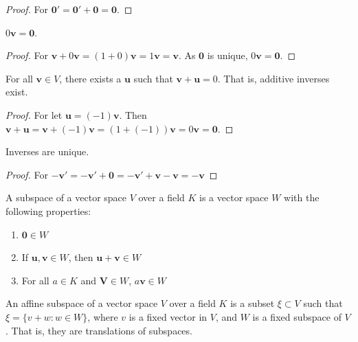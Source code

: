 \documentclass[crop=false,class=book,oneside]{standalone}
\begin{document}
            \begin{proof}
            For $\mathbf{0}'=\mathbf{0}'+\mathbf{0}=\mathbf{0}$.
            \end{proof}
            \begin{theorem}
            $0\mathbf{v} = \mathbf{0}$.
            \end{theorem}
            \begin{proof}
            For $\mathbf{v}+0\mathbf{v} = (1+0)\mathbf{v} = 1\mathbf{v} = \mathbf{v}$. As $\mathbf{0}$ is unique, $0\mathbf{v}=\mathbf{0}$.
            \end{proof}
            \begin{theorem}
            For all $\mathbf{v}\in V$, there exists a $\mathbf{u}$ such that $\mathbf{v}+\mathbf{u}=0$. That is, additive inverses exist.
            \end{theorem}
            \begin{proof}
            For let $\mathbf{u} = (-1)\mathbf{v}$. Then $\mathbf{v}+\mathbf{u} = \mathbf{v}+(-1)\mathbf{v} = (1+(-1))\mathbf{v} = 0\mathbf{v} = \mathbf{0}$.
            \end{proof}
            \begin{theorem}
            Inverses are unique.
            \end{theorem}
            \begin{proof}
            For $-\mathbf{v}'=-\mathbf{v}'+\mathbf{0}=-\mathbf{v}'+\mathbf{v}-\mathbf{v}=- \mathbf{v}$
            \end{proof}
            \begin{definition}
            A subspace of a vector space $V$ over a field $K$ is a vector space $W$ with the following properties:
            \begin{enumerate}
                \item $\mathbf{0} \in W$
                \item If $\mathbf{u,v}\in W$, then $\mathbf{u}+\mathbf{v} \in W$
                \item For all $a\in K$ and $\mathbf{V} \in W$, $a\mathbf{v} \in W$
            \end{enumerate}
            \end{definition}
            \begin{definition}
            An affine subspace of a vector space $V$ over a field $K$ is a subset $\xi\subset V$ such that $\xi = \{v+w:w\in W\}$, where $v$ is a fixed vector in $V$, and $W$ is a fixed subspace of $V$. That is, they are translations of subspaces.
            \end{definition}
\end{document}
